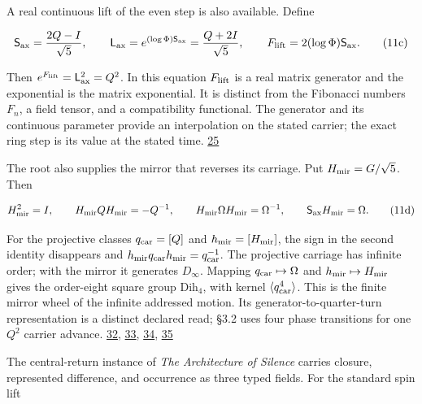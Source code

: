 A real continuous lift of the even step is also available. Define

\[
\mathsf S_{\rm ax}=\frac{2Q-I}{\sqrt5},\qquad
\mathsf L_{\rm ax}=e^{(\log\Phi)\mathsf S_{\rm ax}}
=\frac{Q+2I}{\sqrt5},\qquad
F_{\rm lift}=2(\log\Phi)\mathsf S_{\rm ax}.
\tag{11c}
\]

Then \(e^{F_{\rm lift}}=\mathsf L_{\rm ax}^{2}=Q^2\). In this equation \(F_{\rm lift}\) is a real matrix generator and the exponential is the matrix exponential. It is distinct from the Fibonacci numbers \(F_n\), a field tensor, and a compatibility functional. The generator and its continuous parameter provide an interpolation on the stated carrier; the exact ring step is its value at the stated time. \href{https://github.com/Coppalini-Architecture/coppalini-architecture/blob/9b7122ca5c3712c2c294e2bc5097276d0ba9817b/papers/LINEAR_INFINITY_CANONICAL_v0_1.pdf}{25}

The root also supplies the mirror that reverses its carriage. Put \(H_{\rm mir}=G/\sqrt5\). Then

\[
H_{\rm mir}^{2}=I,\qquad
H_{\rm mir}QH_{\rm mir}=-Q^{-1},\qquad
H_{\rm mir}\Omega H_{\rm mir}=\Omega^{-1},\qquad
\mathsf S_{\rm ax}H_{\rm mir}=\Omega.
\tag{11d}
\]

For the projective classes \(q_{\rm car}=[Q]\) and \(h_{\rm mir}=[H_{\rm mir}]\), the sign in the second identity disappears and \(h_{\rm mir}q_{\rm car}h_{\rm mir}=q_{\rm car}^{-1}\). The projective carriage has infinite order; with the mirror it generates \(D_\infty\). Mapping \(q_{\rm car}\mapsto\Omega\) and \(h_{\rm mir}\mapsto H_{\rm mir}\) gives the order-eight square group \(\mathrm{Dih}_4\), with kernel \(\langle q_{\rm car}^{4}\rangle\). This is the finite mirror wheel of the infinite addressed motion. Its generator-to-quarter-turn representation is a distinct declared read; §3.2 uses four phase transitions for one \(Q^2\) carrier advance. \href{https://chatgpt.com/library?file_id=libfile_d247e341311c8191bb1c0aefc5af4111\&account_id=personal}{32}, \href{https://chatgpt.com/library?file_id=libfile_7054d1b4713481918550a4bf9ef72320\&account_id=personal}{33}, \href{https://chatgpt.com/library?file_id=libfile_5167b051c248819185f3673cbcb6537d\&account_id=personal}{34}, \href{https://github.com/Coppalini-Architecture/coppalini-architecture/blob/9b7122ca5c3712c2c294e2bc5097276d0ba9817b/papers/metric-mirror-symmetry-riemanns-i-machine/metric-mirror-symmetry-riemanns-i-machine-2026-09-09.pdf}{35}

The central-return instance of \emph{The Architecture of Silence} carries closure, represented difference, and occurrence as three typed fields. For the standard spin lift

